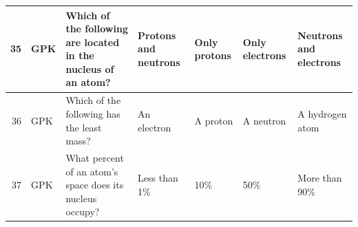 \documentclass[10pt]{article}
\begin{document}
\begin{tiny}
\begin{longtable}{|r|p{0.375in}|p{1.275in}|p{0.75in}|p{0.75in}|p{0.75in}|p{0.75in}|}
    35    &      GPK &                                                                                                                                                                                                                    Which of the following are located in the nucleus of an atom? &                                                                                                                  Protons and neutrons &                                                                                          Only protons &                                                                                                             Only electrons &                                                                                                            Neutrons and electrons \\\hline
    36    &      GPK &                                                                                                                                                                                                                                       Which of the following has the least mass? &                                                                                                                           An electron &                                                                                              A proton &                                                                                                                  A neutron &                                                                                                                   A hydrogen atom \\\hline
    37    &      GPK &                                                                                                                                                                                                                         What percent of an atom's space does its nucleus occupy? &                                                                                                                          Less than 1\% &                                                                                                   10\% &                                                                                                                        50\% &                                                                                                                     More than 90\% \\\hline

\end{longtable}
\end{tiny}
\end{document}
